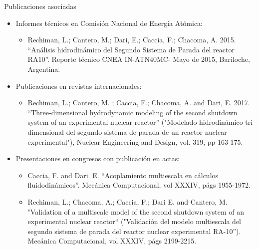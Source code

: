 \documentclass[12pt,screen,twoside,pagebackref]{ibtesis}
\begin{document}
%
%

\begin{biblio}

\end{biblio}


\begin{postliminary}

\begin{seccion}{Publicaciones asociadas}
\begin{itemize}

\item Informes técnicos en Comisión Nacional de Energía Atómica:
\begin{itemize}
\item Rechiman, L.; Cantero, M.; Dari, E.; Caccia, F.; Chacoma, A. 2015. “Análisis hidrodinámico del Segundo Sistema de Parada del reactor RA10”. Reporte técnico CNEA IN-ATN40MC- Mayo de 2015, Bariloche, Argentina.
\end{itemize}

\item Publicaciones en revistas internacionales:
\begin{itemize}
\item Rechiman, L.; Cantero, M. ; Caccia, F.; Chacoma, A. and Dari, E. 2017. “Three-dimensional hydrodynamic modeling of the second shutdown system of an experimental nuclear reactor” ("Modelado hidrodinámico tri-dimensional del segundo sistema de parada de un reactor nuclear experimental"), Nuclear Engineering and Design, vol. 319, pp 163-175.
\end{itemize}

\item Presentaciones en congresos con publicación en actas:
\begin{itemize}
\item Caccia, F. and Dari. E. “Acoplamiento multiescala en cálculos fluidodinámicos”. Mecánica Computacional, vol XXXIV, págs 1955-1972.

\item Rechiman, L.; Chacoma, A.; Caccia, F.; Dari E. and Cantero, M. "Validation of a multiscale model of the second shutdown system of an experimental nuclear reactor“ ("Validación del modelo multiescala del segundo sistema de parada del reactor nuclear experimental RA-10”). Mecánica Computacional, vol XXXIV, págs 2199-2215.
\end{itemize}

\end{itemize}
\end{seccion}


\end{postliminary}
\end{document}
